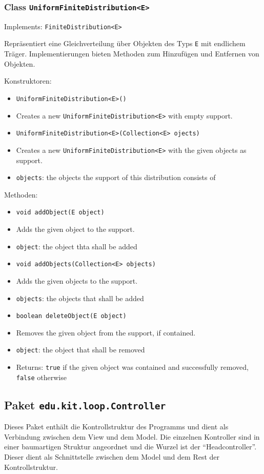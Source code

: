 \documentclass[parskip=full,11pt]{scrartcl}
\begin{document}
\subsubsection{Class \texttt{UniformFiniteDistribution<E>}}
Implements: \texttt{FiniteDistribution<E>}

Repräsentiert eine Gleichverteilung über Objekten des Typs \texttt{E} mit endlichem Träger. Implementierungen bieten Methoden zum Hinzufügen und Entfernen von Objekten.

Konstruktoren:
\begin{itemize}\itemsep -10pt
\item \texttt{UniformFiniteDistribution<E>()}
\item[] Creates a new \texttt{UniformFiniteDistribution<E>} with empty support.

\item \texttt{UniformFiniteDistribution<E>(Collection<E> ojects)}
\item[] Creates a new \texttt{UniformFiniteDistribution<E>} with the given objects as support.
\item[] \texttt{objects}: the objects the support of this distribution consists of
\end{itemize}

Methoden:
\begin{itemize}\itemsep -10pt
\item \texttt{void addObject(E object)}
\item[] Adds the given object to the support.
\item[] \texttt{object}: the object thta shall be added

\item \texttt{void addObjects(Collection<E> objects)}
\item[] Adds the given objects to the support.
\item[] \texttt{objects}: the objects that shall be added

\item \texttt{boolean deleteObject(E object)}
\item[] Removes the given object from the support, if contained.
\item[] \texttt{object}: the object that shall be removed
\item[] Returns: \texttt{true} if the given object was contained and successfully removed, \texttt{false} otherwise
\end{itemize}

\subsection{Paket \texttt{edu.kit.loop.Controller}}
Dieses Paket enthält die Kontrollstruktur des Programms und dient als Verbindung zwischen dem View und dem Model.
Die einzelnen Kontroller sind in einer baumartigen Struktur angeordnet und die Wurzel ist der \enquote{Headcontroller}. Dieser dient als Schnittstelle zwischen dem Model und dem Rest der Kontrollstruktur.
\end{document}
